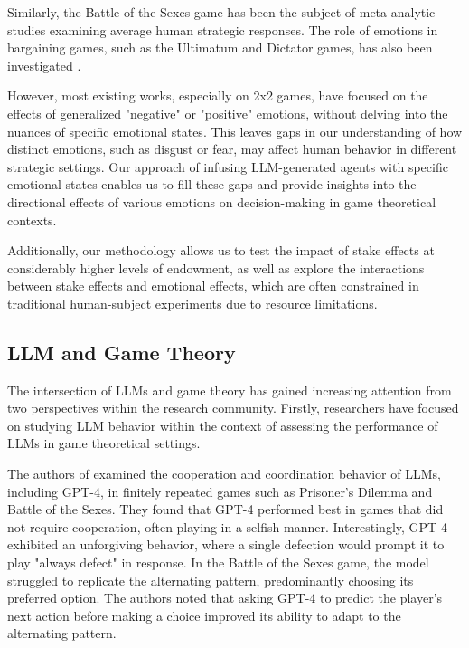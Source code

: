 \documentclass{article}
\begin{document}
Similarly, the Battle of the Sexes game has been the subject of meta-analytic studies \cite{da5c6981-883c-314e-91a7-25477f099152} examining average human strategic responses. The role of emotions in bargaining games, such as the Ultimatum and Dictator games, has also been investigated \cite{harle2007incidental, ANDRADE20091, KAUSEL201496, FORGAS201364}.

However, most existing works, especially on 2x2 games, have focused on the effects of generalized "negative" or "positive" emotions, without delving into the nuances of specific emotional states. This leaves gaps in our understanding of how distinct emotions, such as disgust or fear, may affect human behavior in different strategic settings. Our approach of infusing LLM-generated agents with specific emotional states enables us to fill these gaps and provide insights into the directional effects of various emotions on decision-making in game theoretical contexts.

Additionally, our methodology allows us to test the impact of stake effects at considerably higher levels of endowment, as well as explore the interactions between stake effects and emotional effects, which are often constrained in traditional human-subject experiments due to resource limitations.

\subsection{LLM and Game Theory}
The intersection of LLMs and game theory has gained increasing attention from two perspectives within the research community. Firstly, researchers have focused on studying LLM behavior within the context of assessing the performance of LLMs in game theoretical settings.

The authors of \cite{akata2023playing} examined the cooperation and coordination behavior of LLMs, including GPT-4, in finitely repeated games such as Prisoner's Dilemma and Battle of the Sexes. They found that GPT-4 performed best in games that did not require cooperation, often playing in a selfish manner. Interestingly, GPT-4 exhibited an unforgiving behavior, where a single defection would prompt it to play "always defect" in response. In the Battle of the Sexes game, the model struggled to replicate the alternating pattern, predominantly choosing its preferred option. The authors noted that asking GPT-4 to predict the player's next action before making a choice improved its ability to adapt to the alternating pattern.
\end{document}

